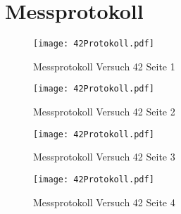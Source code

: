\section{Messprotokoll}
\begin{figure}[h!]
    \centering
    \texttt{[image: 42Protokoll.pdf]}
    \caption{Messprotokoll Versuch 42 Seite 1}
\end{figure}
\newpage
\begin{figure}[h!]
    \centering
    \texttt{[image: 42Protokoll.pdf]}
    \caption{Messprotokoll Versuch 42 Seite 2}
\end{figure}
\newpage
\begin{figure}[h!]
    \centering
    \texttt{[image: 42Protokoll.pdf]}
    \caption{Messprotokoll Versuch 42  Seite 3}
\end{figure}
\newpage
\begin{figure}[h!]
    \centering
    \texttt{[image: 42Protokoll.pdf]}
    \caption{Messprotokoll Versuch 42 Seite 4}
\end{figure}
\newpage